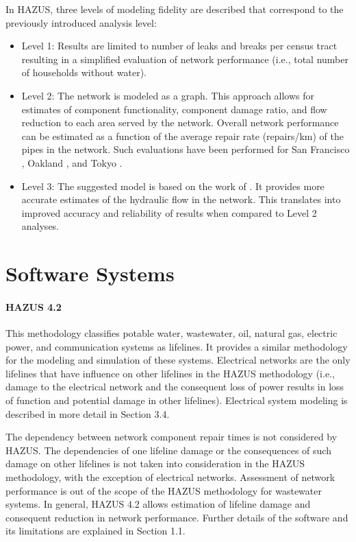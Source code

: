 \noindent In HAZUS, three levels of modeling fidelity are described that correspond to the previously introduced analysis level: 

\begin{itemize}
    \item Level 1: Results are limited to number of leaks and breaks per census tract resulting in a simplified evaluation of network performance (i.e., total number of households without water).
    \item Level 2: The network is modeled as a graph. This approach allows for estimates of component functionality, component damage ratio, and flow reduction to each area served by the network. Overall network performance can be estimated as a function of the average repair rate (repairs/km) of the pipes in the network. Such evaluations have been performed for San Francisco \citep{markov1994evaluation}, Oakland \citep{geengineeringsystems1994nibs}, and Tokyo \citep{isoyama1982reliability}.
    \item Level 3: The suggested model is based on the work of \cite{khater1999potable}. It provides more accurate estimates of the hydraulic flow in the network. This translates into improved accuracy and reliability of results when compared to Level 2 analyses.
\end{itemize}

\section{Software Systems}
\label{sec:perf_pipeline_tools}

\paragraph{HAZUS 4.2} This methodology classifies potable water, wastewater, oil, natural gas, electric power, and communication systems as lifelines. It provides a similar methodology for the modeling and simulation of these systems. Electrical networks are the only lifelines that have influence on other lifelines in the HAZUS methodology (i.e., damage to the electrical network and the consequent loss of power results in loss of function and potential damage in other lifelines). Electrical system modeling is described in more detail in Section 3.4.

The dependency between network component repair times is not considered by HAZUS. The dependencies of one lifeline damage or the consequences of such damage on other lifelines is not taken into consideration in the HAZUS methodology, with the exception of electrical networks. Assessment of network performance is out of the scope of the HAZUS methodology for wastewater systems. In general, HAZUS 4.2 allows estimation of lifeline damage and consequent reduction in network performance. Further details of the software and its limitations are explained in Section 1.1.

